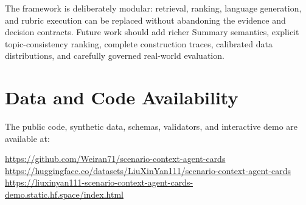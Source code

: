 \documentclass[10pt]{article}
\begin{document}
The framework is deliberately modular: retrieval, ranking, language generation, and rubric execution can be replaced without abandoning the evidence and decision contracts. Future work should add richer Summary semantics, explicit topic-consistency ranking, complete construction traces, calibrated data distributions, and carefully governed real-world evaluation.

\section*{Data and Code Availability}

The public code, synthetic data, schemas, validators, and interactive demo are available at:
\begin{center}
\url{https://github.com/Weiran71/scenario-context-agent-cards}\\
\url{https://huggingface.co/datasets/LiuXinYan111/scenario-context-agent-cards}\\
\url{https://liuxinyan111-scenario-context-agent-cards-demo.static.hf.space/index.html}
\end{center}



\end{document}

